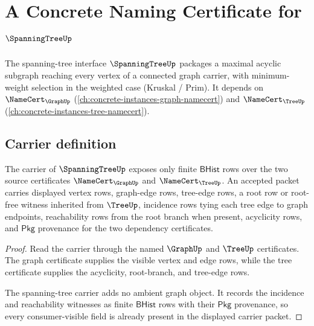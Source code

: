 \chapter{A Concrete Naming Certificate for $\SpanningTreeUp$}
\label{ch:concrete-instances-spanningtree-namecert}

The spanning-tree interface $\SpanningTreeUp$ packages a maximal acyclic subgraph reaching every vertex of a connected graph carrier, with minimum-weight selection in the weighted case (Kruskal / Prim). It depends on $\NameCert_{\GraphUp}$ (\autoref{ch:concrete-instances-graph-namecert}) and $\NameCert_{\TreeUp}$ (\autoref{ch:concrete-instances-tree-namecert}).

\section{Carrier definition}
\label{sec:spanningtree-carrier}

\begin{theorem}
\label{thm:spanningtree-carrier-obligation}
The carrier of $\SpanningTreeUp$ exposes only finite $\mathsf{BHist}$ rows over the two source certificates $\NameCert_{\GraphUp}$ and $\NameCert_{\TreeUp}$. An accepted packet carries displayed vertex rows, graph-edge rows, tree-edge rows, a root row or root-free witness inherited from $\TreeUp$, incidence rows tying each tree edge to graph endpoints, reachability rows from the root branch when present, acyclicity rows, and $\mathsf{Pkg}$ provenance for the two dependency certificates.
\end{theorem}
\begin{proof}
Read the carrier through the named $\GraphUp$ and $\TreeUp$ certificates. The graph certificate supplies the visible vertex and edge rows, while the tree certificate supplies the acyclicity, root-branch, and tree-edge rows.

The spanning-tree carrier adds no ambient graph object. It records the incidence and reachability witnesses as finite $\mathsf{BHist}$ rows with their $\mathsf{Pkg}$ provenance, so every consumer-visible field is already present in the displayed carrier packet.
\end{proof}

